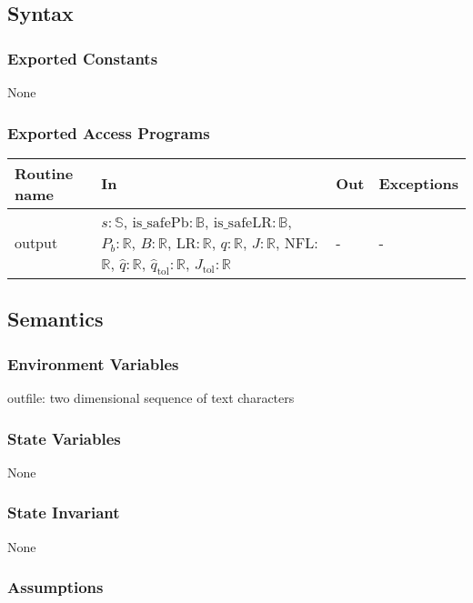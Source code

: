 \documentclass[12pt, titlepage]{article}
\begin{document}
\subsection {Syntax}

\subsubsection {Exported Constants}

None

\subsubsection {Exported Access Programs}

\begin{tabular}{| l | p{10cm} | l | l |}
\hline
\textbf{Routine name} & \textbf{In} & \textbf{Out} & \textbf{Exceptions}\\
\hline
output & $s: \mathbb{S}$, $\mbox{is\_safePb}: \mathbb{B}$,
         $\mbox{is\_safeLR}: \mathbb{B}$, $P_b: \mathbb{R}$, $B: \mathbb{R}$, LR$: \mathbb{R}$, $q:
         \mathbb{R}$,  $J: \mathbb{R}$, NFL: $\mathbb{R}$, $\hat{q}: \mathbb{R}$,
         $\hat{q}_{\text{tol}}: \mathbb{R}$, $J_{\text{tol}}: \mathbb{R}$ & - & -\\
\hline
\end{tabular}

\subsection {Semantics}

\subsubsection {Environment Variables}

outfile: two dimensional sequence of text characters

\subsubsection {State Variables}

None

\subsubsection {State Invariant}

None

\subsubsection {Assumptions}
\end{document}
